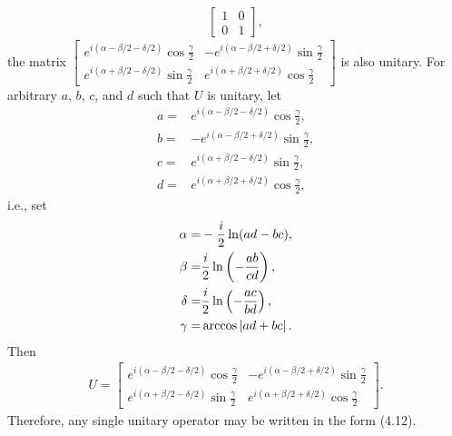 \documentclass[en]{sol-man}
\begin{document}
\begin{sol}
\begin{align}
\begin{bmatrix}
                1&0\\
                0&1
            \end{bmatrix},
        \end{align}
        the matrix $\begin{bmatrix}
            e^{i(\alpha-\beta/2-\delta/2)}\cos\frac{\gamma}{2}&-e^{i(\alpha-\beta/2+\delta/2)}\sin\frac{\gamma}{2}\\
            e^{i(\alpha+\beta/2-\delta/2)}\sin\frac{\gamma}{2}&e^{i(\alpha+\beta/2+\delta/2)}\cos\frac{\gamma}{2}
        \end{bmatrix}$ is also unitary.
        For arbitrary $a$, $b$, $c$, and $d$ such that $U$ is unitary, let
        \begin{align}
            a=&e^{i(\alpha-\beta/2-\delta/2)}\cos\frac{\gamma}{2},\\
            b=&-e^{i(\alpha-\beta/2+\delta/2)}\sin\frac{\gamma}{2},\\
            c=&e^{i(\alpha+\beta/2-\delta/2)}\sin\frac{\gamma}{2},\\
            d=&e^{i(\alpha+\beta/2+\delta/2)}\cos\frac{\gamma}{2},
        \end{align}
        i.e., set
        \begin{align}
            \alpha=&-\frac{i}{2}\ln(ad-bc),\\
            \beta=&\frac{i}{2}\ln\left(-\frac{ab}{cd}\right),\\
            \delta=&\frac{i}{2}\ln\left(-\frac{ac}{bd}\right),\\
            \gamma=&\arccos\left\lvert ad+bc\right\rvert.
        \end{align}
        Then
        \begin{align}
            U=\begin{bmatrix}
                e^{i(\alpha-\beta/2-\delta/2)}\cos\frac{\gamma}{2}&-e^{i(\alpha-\beta/2+\delta/2)}\sin\frac{\gamma}{2}\\
                e^{i(\alpha+\beta/2-\delta/2)}\sin\frac{\gamma}{2}&e^{i(\alpha+\beta/2+\delta/2)}\cos\frac{\gamma}{2}
            \end{bmatrix}.
        \end{align}
        Therefore, any single unitary operator may be written in the form (4.12).
\end{sol}
\end{document}
